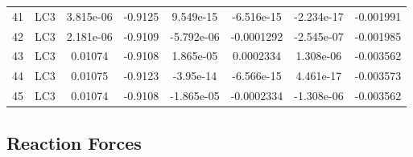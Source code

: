 \documentclass{article}%
\begin{document}
\begin{longtable}{| c c | c c c c c c |}
41&LC3&3.815e{-}06&{-}0.9125&9.549e{-}15&{-}6.516e{-}15&{-}2.234e{-}17&{-}0.001991\\%
42&LC3&2.181e{-}06&{-}0.9109&{-}5.792e{-}06&{-}0.0001292&{-}2.545e{-}07&{-}0.001985\\%
43&LC3&0.01074&{-}0.9108&1.865e{-}05&0.0002334&1.308e{-}06&{-}0.003562\\%
44&LC3&0.01075&{-}0.9123&{-}3.95e{-}14&{-}6.566e{-}15&4.461e{-}17&{-}0.003573\\%
45&LC3&0.01074&{-}0.9108&{-}1.865e{-}05&{-}0.0002334&{-}1.308e{-}06&{-}0.003562\\%
\end{longtable}

%
\subsection{Reaction Forces}%
\label{subsec:ReactionForces}%
\end{document}
